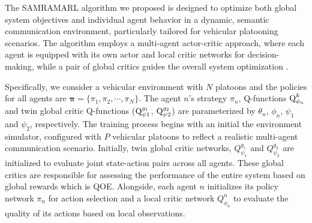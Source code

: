 \documentclass[10pt, lettersize,journal]{IEEEtran}
\begin{document}
	The SAMRAMARL algorithm we proposed is designed to optimize both global system objectives and individual agent behavior in a dynamic, semantic communication environment, particularly tailored for vehicular platooning scenarios. The algorithm employs a multi-agent actor-critic approach, where each agent is equipped with its own actor and local critic networks for decision-making, while a pair of global critics guides the overall system optimization \cite{RN8}.
	
	Specifically, we consider a vehicular environment with $N$ platoons and the policies for all agents are $\mathbf{\pi} = \{ {\pi _1},{\pi _2}, \cdots ,{\pi _N}\}$. The agent $n$'s strategy $\pi_n$, Q-functions 
	${\mathop{\rm Q}\nolimits} _{{\phi _n}}^k$ and twin global critic Q-functions 
	(${\mathop{\rm Q}\nolimits} _{\psi 1}^{{g_1}}$, ${\mathop{\rm Q}\nolimits} _{\psi 2}^{{g_2}}$) are parameterized by ${\theta _n}$, $\phi_n$, ${\psi _1}$ and $\psi_2$, respectively.
	The training process begins with an initial  the environment simulator, configured with $P$ vehicular platoons to reflect a realistic multi-agent communication scenario. Initially, twin global critic networks, $Q_{{\psi _1}}^{{g_1}}$ and $Q_{{\psi _2}}^{{g_2}}$ are initialized to evaluate joint state-action pairs across all agents. These global critics are responsible for assessing the performance of the entire system based on global rewards which is QOE.  
	Alongside, each agent $n$ initializes its policy network ${\pi _n}$	for action selection and a local critic network $Q_{{\phi _n}}^n$ to evaluate the quality of its actions based on local observations.
	
\end{document}
